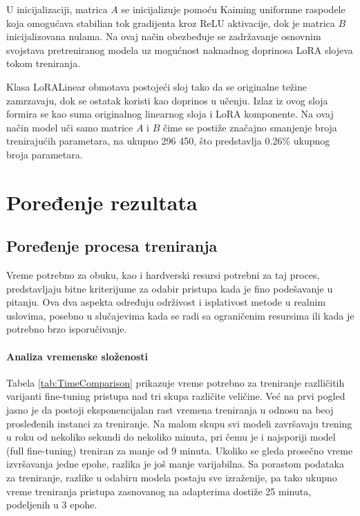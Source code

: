 \documentclass[12pt,oneside]{memoir}
\begin{document}
U inicijalizaciji, matrica $A$ se inicijalizuje pomoću Kaiming\cite{he2015delving} uniformne raspodele koja omogućava stabilian tok gradijenta kroz ReLU aktivacije, dok je matrica $B$ inicijalizovana nulama. Na ovaj način obezbeđuje se zadržavanje osnovnim svojstava pretreniranog modela uz mogućnost naknadnog doprinosa LoRA slojeva tokom treniranja.

Klasa LoRALinear obmotava postojeći sloj tako da se originalne težine zamrzavaju, dok se ostatak koristi kao doprinos u učenju. Izlaz iz ovog sloja formira se kao suma originalnog linearnog sloja i LoRA komponente. Na ovaj način model uči samo matrice $A$ i $B$ čime se postiže značajno smanjenje broja trenirajućih parametara, na ukupno 296 450, što predstavlja 0.26\% ukupnog broja parametara.

\chapter{Poređenje rezultata}

\section{Poređenje procesa treniranja}

Vreme potrebno za obuku, kao i hardverski resursi potrebni za taj proces, predstavljaju bitne kriterijume za odabir pristupa kada je fino podešavanje u pitanju. Ova dva aspekta određuju održivost i isplativost metode u realnim uslovima, posebno u slučajevima kada se radi sa ograničenim resursima ili kada je potrebno brzo isporučivanje.

\subsubsection{Analiza vremenske složenosti}
Tabela \ref{tab:TimeComparison} prikazuje vreme potrebno za treniranje razlličitih varijanti fine-tuning pristupa nad tri skupa različite veličine. Već na prvi pogled jasno je da postoji eksponencijalan rast vremena treniranja u odnosu na beoj prosleđenih instanci za treniranje. Na malom skupu svi modeli završavaju trening u roku od nekoliko sekundi do nekoliko minuta, pri čemu je i najsporiji model (full fine-tuning) treniran za manje od 9 minuta. Ukoliko se gleda prosečno vreme izvršavanja jedne epohe, razlika je još manje varijabilna. Sa porastom podataka za treniranje, razlike u odabiru modela postaju sve izraženije, pa tako ukupno vreme treniranja pristupa zasnovanog na adapterima dostiže 25 minuta, podeljenih u 3 epohe. 
\end{document}
